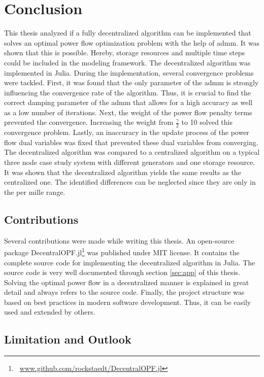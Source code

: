 \section{Conclusion}

This thesis analyzed if a fully decentralized algorithm can be implemented that solves an optimal power flow optimization problem with the help of \gls{admm}. It was shown that this is possible. Hereby, storage resources and multiple time steps could be included in the modeling framework. The decentralized algorithm was implemented in Julia. During the implementation, several convergence problems were tackled. First, it was found that the only parameter of the \gls{admm} is strongly influencing the convergence rate of the algorithm. Thus, it is crucial to find the correct damping parameter of the \gls{admm} that allows for a high accuracy as well as a low number of iterations. Next, the weight of the power flow penalty terms prevented the convergence. Increasing the weight from $\frac{\gamma}{2}$ to 10 solved this convergence problem. Lastly, an inaccuracy in the update process of the power flow dual variables was fixed that prevented these dual variables from converging. The decentralized algorithm was compared to a centralized algorithm on a typical three node case study system with different generators and one storage resource. It was shown that the decentralized algorithm yields the same results as the centralized one. The identified differences can be neglected since they are only in the per mille range.

\subsection{Contributions}

Several contributions were made while writing this thesis. An open-source package DecentralOPF.jl\footnote{~\url{www.github.com/rockstaedt/DecentralOPF.jl}} was published under MIT license. It contains the complete source code for implementing the decentralized algorithm in Julia. The source code is very well documented through section \ref{sec:app} of this thesis. Solving the optimal power flow in a decentralized manner is explained in great detail and always refers to the source code. Finally, the project structure was based on best practices in modern software development. Thus, it can be easily used and extended by others.

\subsection{Limitation and Outlook}

